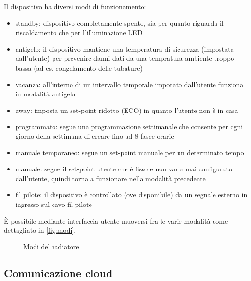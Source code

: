 \documentclass[12pt,a4paper,twoside,titlepage]{book}
\begin{document}
Il dispositivo ha diversi modi di funzionamento:
\begin{itemize}
    \item standby: dispositivo completamente spento, sia per quanto riguarda il riscaldamento
        che per l'illuminazione LED
    \item antigelo: il dispositivo mantiene una temperatura di sicurezza (impostata dall'utente)
        per prevenire danni dati da una tempratura ambiente troppo bassa (ad es. congelamento delle tubature)
    \item vacanza: all'interno di un intervallo temporale impotato dall'utente funziona
        in modalità antigelo
    \item away: imposta un set-point ridotto (ECO) in quanto l'utente non è in casa
    \item programmato: segue una programmazione settimanale che consente per ogni
        giorno della settimana di creare fino ad 8 fasce orarie
    \item manuale temporaneo: segue un set-point manuale per un determinato tempo
    \item manuale: segue il set-point utente che è fisso e non varia mai
        configurato dall'utente, quindi torna a funzionare nella modalità precedente
    \item fil pilote: il dispositivo è controllato (ove disponibile) da un segnale
        esterno in ingresso sul cavo fil pilote
\end{itemize}

È possibile mediante interfaccia utente muoversi fra le varie modalità come dettagliato
in \autoref{fig:modi}.

\begin{figure}[ht]
    \centering
    \caption{Modi del radiatore}
    \label{fig:modi}
\end{figure}

\subsection{Comunicazione cloud}
\end{document}
